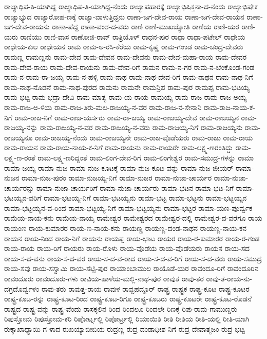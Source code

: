 {ರಾಜ್ಯಾಧಿಪ-ತಿ-ಯಾಗಿದ್ದ
ರಾಜ್ಯಾಧಿಪ-ತಿ-ಯಾಗಿದ್ದ-ನೆಂದು
ರಾಜ್ಯಾಪಹಾರಕ್ಕೆ
ರಾಜ್ಯಾಭಿಷಿಕ್ತನಾ-ದ-ನೆಂದು
ರಾಜ್ಯಾಭಿಷೇಕ
ರಾಜ್ಯಾಭ್ಯುದ
ರಾಜ್ಯಾರೋಹ-ಣಕ್ಕೆ
ರಾಜ್ಯಾ-ವಾಳುತ್ತಿದ್ದನು
ರಾಣಾ-ಜಗ-ದೇವ-ರಾಯ
ರಾಣಾ-ಜಗ-ದೇವ-ರಾಯನ
ರಾಣಾ-ಜಗ-ದೇವ-ರಾಯನು
ರಾಣಾ-ಪೆದ್ದ
ರಾಣಾ-ವಂಶ-ದ-ವರು
ರಾಣಿ
ರಾಣಿ-ಮುಖಜ್ಯೋತಿ
ರಾಣಿಯ
ರಾಣಿ-ಯರ
ರಾಣಿ-ಯರು
ರಾಣಿಯು
ರಾಣಿ-ವಾಸ
ರಾಣೋಜಿ-ರಾವ್
ರಾತ್ರಿಯೊಳ್
ರಾಧನ-ಪುರ
ರಾಧಾ
ರಾಧಾ-ಪಟೇಲ್
ರಾಧೇಯ
ರಾಧೇಯ-ಕುಲ
ರಾಧೇಯನ
ರಾಮ
ರಾಮ-ಅ-ರಸಿ-ಕೆರೆಯ
ರಾಮ-ಕೃಷ್ಣ
ರಾಮ-ಗಉಡ
ರಾಮ-ಚಂದ್ರ-ದೇವರು
ರಾಮಣ್ಣ
ರಾಮಣ್ಣನು
ರಾಮ-ದೇವ
ರಾಮ-ದೇವನ
ರಾಮ-ದೇವನು
ರಾಮ-ದೇವ-ಮಹಾ-ರಾಯ
ರಾಮ-ದೇವರ
ರಾಮ-ದೇವ-ರಾಯ
ರಾಮ-ದೇವ-ರಾಯನು
ರಾಮ-ದೇವ-ರಿಗೆ
ರಾಮನ
ರಾಮ-ನ-ಗರ
ರಾಮ-ನ-ಬೆಂಕೊಂಡ-ಗಂಡ
ರಾಮ-ನ-ರಾಮ-ರಾ-ಜಯ್ಯ
ರಾಮ-ನ-ಹಳ್ಳಿ
ರಾಮ-ನಾಥ
ರಾಮ-ನಾಥ-ದೇವ-ರಿಗೆ
ರಾಮ-ನಾಥನ
ರಾಮ-ನಾಥ-ನಿಗೆ
ರಾಮ-ನಾಥ-ನೊಡನೆ
ರಾಮ-ನಾಥ-ಪುರದ
ರಾಮನು
ರಾಮನೇ
ರಾಮನ್ರಿಪ
ರಾಮ-ಪುರ
ರಾಮಪ್ಪ
ರಾಮ-ಭಟಯ್ಯ
ರಾಮ-ಭಟ್ಟ
ರಾಮ-ಭದ್ರಾ-ದೇವಿ
ರಾಮ-ಮಾತ್ಯ
ರಾಮ-ಯ-ರಾಯ
ರಾಮಯ್ಯ
ರಾಮ-ರಾಜ
ರಾಮ-ರಾಜ-ಅಯ್ಯ
ರಾಮ-ರಾಜ-ಅ-ಳಿಯ
ರಾಮ-ರಾಜ-ತಿರು-ಮಲ-ರಾಜಯ್ಯ-ನ-ವರ
ರಾಮ-ರಾಜ-ನ-ಸೇನಾನಿ
ರಾಮ-ರಾಜ-ನಾಯ-ಕ-ನಿಗೆ
ರಾಮ-ರಾಜ-ನಿಗೆ
ರಾಮ-ರಾಜ-ಯರ್ಸರು
ರಾಮ-ರಾ-ಜಯ್ಯ
ರಾಮ-ರಾಜಯ್ಯ-ದೇವ
ರಾಮ-ರಾಜಯ್ಯನ
ರಾಮ-ರಾಜಯ್ಯ-ನನ್ನು
ರಾಮ-ರಾಜಯ್ಯ-ನ-ವರ
ರಾಮ-ರಾಜಯ್ಯ-ನ-ವರು
ರಾಮ-ರಾಜಯ್ಯ-ನಿಗೆ
ರಾಮ-ರಾಜಯ್ಯನು
ರಾಮ-ರಾಜಯ್ಯನೂ
ರಾಮ-ರಾಜಯ್ಯ-ನೆಂದು
ರಾಮ-ರಾಜಯ್ಯನೇ
ರಾಮ-ರಾಜ-ವೊಡೆಯರು
ರಾಮ-ರಾಜು
ರಾಮ-ರಾಯ
ರಾಮ-ರಾಯನ
ರಾಮ-ರಾಯ-ನಾಯ-ಕ-ನಿಗೆ
ರಾಮ-ರಾಯನು
ರಾಮ-ರಾಯರೇ
ರಾಮ-ಲಕ್ಷ್ಮ-ಣರಂತಿದ್ದು
ರಾಮ-ಲಕ್ಷ್ಮ-ಣ-ರಂತೆ
ರಾಮ-ಲಕ್ಷ್ಮ-ಣರಿದ್ದಂತೆ
ರಾಮ-ಲಿಂಗ-ದೇವ-ರಿಗೆ
ರಾಮ-ಲಿಂಗೇಶ್ವರ
ರಾಮ-ಸಮುದ್ರ-ಗಳನ್ನು
ರಾಮಾ
ರಾಮಾ-ಜಯ್ಯ
ರಾಮಾ-ನುಜ
ರಾಮಾ-ನುಜ-ಕೂಟಕ್ಕೆ
ರಾಮಾ-ನುಜ-ಕೂಟ-ವನ್ನು
ರಾಮಾ-ನುಜ-ಜೀಯರ್
ರಾಮಾ-ನುಜನ
ರಾಮಾ-ನುಜ-ಪುರಂ
ರಾಮಾ-ನುಜಯ್ಯ-ನಿಗೆ
ರಾಮಾ-ನುಜರ
ರಾಮಾ-ನುಜಾ-ಚಾರ್ಯರ
ರಾಮಾ-ನುಜಾ-ಚಾರ್ಯರನ್ನು
ರಾಮಾ-ನುಜಾ-ಚಾರ್ಯರಿಗೆ
ರಾಮಾ-ನುಜಾ-ಚಾರ್ಯರು
ರಾಮಾ-ಭಟನ
ರಾಮಾ-ಭಟ-ನಿಗೆ
ರಾಮಾ-ಭಟಯ್ಯನ-ವರಿಗೆ
ರಾಮಾ-ಭಟಯ್ಯ-ನಿಗೆ
ರಾಮಾ-ಭಟಯ್ಯನು
ರಾಮಾ-ಭಟ್ಟ
ರಾಮಾ-ಭಟ್ಟನು
ರಾಮಾ-ಭಟ್ಟಯ್ಯನ
ರಾಮಾ-ಭಟ್ಟಯ್ಯನ-ವ-ರಿಂದ
ರಾಮಾ-ಭಟ್ಟಯ್ಯ-ನಿಗೆ
ರಾಮಾ-ಭಟ್ಟಯ್ಯನು
ರಾಮಾ-ಭಟ್ಟರ
ರಾಮಾ-ಯಣ-ಪೂರ್ವ್ವಕ
ರಾಮೆಯ-ನಾಯ-ಕನು
ರಾಮೆಯ-ನಾಯ್ಕ
ರಾಮೇಶ್ವರ
ರಾಮೇಶ್ವರದ
ರಾಮೇಶ್ವರ-ದಲ್ಲಿ
ರಾಮೇಶ್ವರ-ದ-ವರೆಗೂ
ರಾಯ
ರಾಯಂಣ
ರಾಯ-ಕುಮಾರರ
ರಾಯ-ಣ-ನಾಯ-ಕನು
ರಾಯಣ್ಣ
ರಾಯಣ್ಣ-ದಂಡ-ನಾಥನ
ರಾಯಣ್ಣ-ನಾಯ-ಕನ
ರಾಯನ
ರಾಯ-ನಿಂದ
ರಾಯ-ನಿಗೆ
ರಾಯನು
ರಾಯಪ್ಪ
ರಾಯ-ಭಾಟ
ರಾಯರ
ರಾಯ-ರ-ಕುಮಾರರ
ರಾಯ-ರ-ಗಂಡ
ರಾಯ-ರಾಯ
ರಾಯ-ರಿಗೆ
ರಾಯರು
ರಾಯ-ರೊಳು
ರಾಯ-ವೊಡೆಯ
ರಾಯ-ವೊಡೆಯರು
ರಾಯಸ
ರಾಯ-ಸದ
ರಾಯ-ಸ-ದ-ವನು
ರಾಯ-ಸ-ದ-ವರ
ರಾಯ-ಸ-ದ-ವ-ರಾದ
ರಾಯ-ಸ-ದ-ವ-ರಿಗೆ
ರಾಯ-ಸ-ದ-ವರು
ರಾಯ-ಸಮುದ್ರ
ರಾಯ-ಸವು
ರಾಯ-ಸಸ್ವಾಮಿ
ರಾಯ-ಸೆಟ್ಟಿ-ಪುರ
ರಾಯಾಂಬಾಮುಲ
ರಾಯೊಡೆ-ಯರ
ರಾವಂದೂ-ರಿಗೆ
ರಾವಂದೂರಿನ
ರಾವಂದೂರು
ರಾವಂದೂರು-ಗಳು
ರಾವಿಯ-ಹಾಳೆಯ-ಮಲ್ಲಿ-ನಾಥ-ಪುರ
ರಾವುತ
ರಾವು-ತರ
ರಾವು-ತ-ರಾಯ-ನು-ದಗ್ರದೊರ್ವ್ವಳಂ
ರಾವು-ತರು
ರಾವುತ್ತ-ರಾಯ
ರಾವುಳ
ರಾವ್ಬಹದ್ದೂರ್
ರಾಷ್ಟ್ರ
ರಾಷ್ಟ್ರಕ
ರಾಷ್ಟ್ರ-ಕೂಟ
ರಾಷ್ಟ್ರ-ಕೂಟರ
ರಾಷ್ಟ್ರ-ಕೂಟ-ರನ್ನು
ರಾಷ್ಟ್ರ-ಕೂಟ-ರಿಂದ
ರಾಷ್ಟ್ರ-ಕೂಟ-ರಿಗೂ
ರಾಷ್ಟ್ರ-ಕೂಟರು
ರಾಷ್ಟ್ರ-ಕೂಟರೇ
ರಾಷ್ಟ್ರ-ಕೂಟ-ರೊಡನೆ
ರಾಷ್ಟ್ರದ
ರಾಷ್ಟ್ರ-ವನ್ನು
ರಾಷ್ಟ್ರ-ವೆಂದು
ರಾಸಕ್ಕಲಿನ
ರಿಂದ
ರಿಂದಲೂ
ರಿಂದಲೇ
ರಿಣಕ್ಕೆ
ರಿಪು-ರಾಮ-ಗಾಮುಣ್ಡರು
ರಿಪುಸ್ತೋಮ
ರಿಪುಸ್ತೋಮ-ಕರಿ
ರಿಪೋರ್ಟ್ನಲ್ಲಿ
ರಿಪೋರ್ಟ್ರಲ್ಲಿ
ರಿಯಾಯಿತಿ
ರೀತಿ
ರೀತಿಯ
ರೀತಿ-ಯಲ್ಲಿ
ರೀತಿ-ಯಾಗಿ
ರುಕ್ಶಾಖಾಧ್ಯಾಯಿ-ಗ-ಳಾದ
ರುಖಯ್ಯಾಬೀಬಿಯ
ರುದ್ರಣ್ಣ
ರುದ್ರ-ದಂಡಾಧೀಶ-ನಿಗೆ
ರುದ್ರ-ದೇವಾತ್ಮಜಂ
ರುದ್ರ-ಭಟ್ಟ
}
